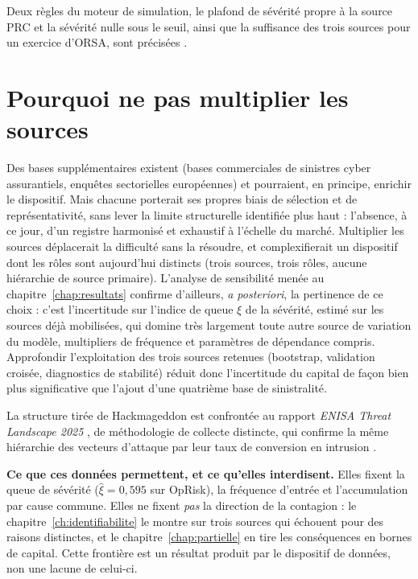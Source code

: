 Deux règles du moteur de simulation, le plafond de sévérité propre à la source PRC et la
sévérité nulle sous le seuil, ainsi que la suffisance des trois sources pour un exercice
d'ORSA, sont précisées \matcomp.


\section{Pourquoi ne pas multiplier les sources}

Des bases
supplémentaires existent (bases commerciales de sinistres cyber assurantiels,
enquêtes sectorielles européennes) et pourraient, en principe, enrichir le
dispositif. Mais chacune porterait ses propres biais de sélection et de
représentativité, sans lever la limite structurelle identifiée plus haut :
l'absence, à ce jour, d'un registre harmonisé et exhaustif à
l'échelle du marché. Multiplier les sources déplacerait la difficulté sans la
résoudre, et complexifierait un dispositif dont les rôles sont aujourd'hui distincts (trois
sources, trois rôles, aucune hiérarchie de \og source primaire\fg{}). L'analyse de sensibilité menée
au chapitre~\ref{chap:resultats} confirme d'ailleurs, \emph{a posteriori}, la pertinence de ce choix :
c'est l'incertitude sur l'indice de queue $\xi$ de la sévérité, estimé sur
les sources déjà mobilisées, qui domine très largement toute autre source
de variation du modèle, multipliers de fréquence et paramètres de dépendance
compris. Approfondir l'exploitation des trois sources retenues (bootstrap,
validation croisée, diagnostics de stabilité) réduit donc l'incertitude du
capital de façon bien plus significative que l'ajout d'une quatrième base de
sinistralité.



La structure tirée de Hackmageddon est confrontée au rapport \emph{ENISA Threat Landscape 2025}
\citep{enisa2025}, de méthodologie de collecte distincte, qui confirme la même hiérarchie des
vecteurs d'attaque par leur taux de conversion en intrusion \matcomp.


\begin{cle}
\textbf{Ce que ces données permettent, et ce qu'elles interdisent.} Elles fixent la queue de
sévérité ($\hat\xi = 0{,}595$ sur OpRisk), la fréquence d'entrée et l'accumulation par cause
commune. Elles ne fixent \emph{pas} la direction de la contagion : le
chapitre~\ref{ch:identifiabilite} le montre sur trois sources qui échouent pour des raisons
distinctes, et le
chapitre~\ref{chap:partielle} en tire les conséquences en bornes de capital. Cette frontière
est un résultat produit par le dispositif de données, non une lacune de celui-ci.
\end{cle}


